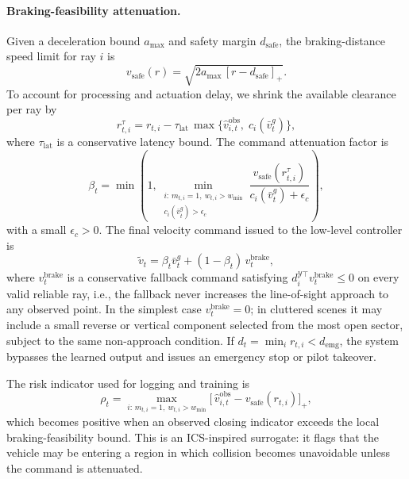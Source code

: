 \documentclass[11pt]{article}
\begin{document}
\paragraph{Braking-feasibility attenuation.}
Given a deceleration bound $a_{\max}$ and safety margin $d_{\mathrm{safe}}$, the
braking-distance speed limit for ray $i$ is
\begin{equation}
    v_{\mathrm{safe}}(r)
    = \sqrt{2a_{\max}\,[r-d_{\mathrm{safe}}]_+}.
    \label{eq:vsafe}
\end{equation}
To account for processing and actuation delay, we shrink the available clearance
per ray by
\begin{equation}
    r^{\tau}_{t,i}
    = r_{t,i} - \tau_{\mathrm{lat}}\,
      \max\{\hat v^{\mathrm{obs}}_{i,t},\; c_i(\bar v^g_t)\},
    \label{eq:latency_margin}
\end{equation}
where $\tau_{\mathrm{lat}}$ is a conservative latency bound. The command
attenuation factor is
\begin{equation}
    \beta_t
    = \min\!\left(1,
    \min_{\substack{i:\,m_{t,i}=1,\ w_{t,i}>w_{\min}\\
    c_i(\bar v^g_t)>\epsilon_c}}
    \frac{v_{\mathrm{safe}}(r^{\tau}_{t,i})}
         {c_i(\bar v^g_t)+\epsilon_c}
    \right),
    \label{eq:beta_attenuation}
\end{equation}
with a small $\epsilon_c>0$. The final velocity command issued to the low-level
controller is
\begin{equation}
    \tilde v_t = \beta_t \bar v^g_t + (1-\beta_t)\,v^{\mathrm{brake}}_t,
    \label{eq:final_command}
\end{equation}
where $v^{\mathrm{brake}}_t$ is a conservative fallback command satisfying
$d_i^{\mathcal{Y}\top} v^{\mathrm{brake}}_t \le 0$ on every valid reliable ray,
i.e., the fallback never increases the line-of-sight approach to any observed
point. In the simplest case $v^{\mathrm{brake}}_t=0$; in cluttered scenes it may
include a small reverse or vertical component selected from the most open
sector, subject to the same non-approach condition. If
$d_t=\min_i r_{t,i}<d_{\mathrm{emg}}$, the system bypasses the learned output and
issues an emergency stop or pilot takeover.

The risk indicator used for logging and training is
\begin{equation}
    \rho_t
    = \max_{i:\,m_{t,i}=1,\ w_{t,i}>w_{\min}}
    \bigl[\,\hat v^{\mathrm{obs}}_{i,t} - v_{\mathrm{safe}}(r_{t,i})\bigr]_+ ,
    \label{eq:risk_indicator}
\end{equation}
which becomes positive when an observed closing indicator exceeds the local
braking-feasibility bound. This is an ICS-inspired surrogate: it flags that the
vehicle may be entering a region in which collision becomes unavoidable unless
the command is attenuated.
\end{document}
